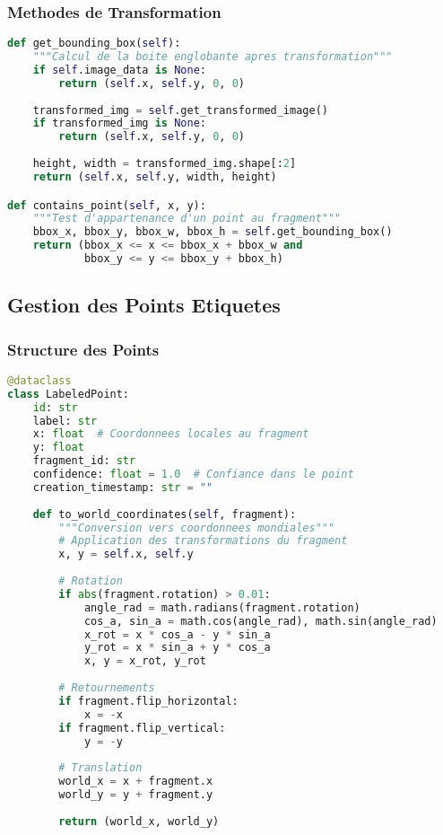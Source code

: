 \documentclass[12pt,a4paper]{article}
\begin{document}
\subsubsection{Methodes de Transformation}

\begin{lstlisting}[language=Python]
def get_bounding_box(self):
    """Calcul de la boite englobante apres transformation"""
    if self.image_data is None:
        return (self.x, self.y, 0, 0)
    
    transformed_img = self.get_transformed_image()
    if transformed_img is None:
        return (self.x, self.y, 0, 0)
    
    height, width = transformed_img.shape[:2]
    return (self.x, self.y, width, height)

def contains_point(self, x, y):
    """Test d'appartenance d'un point au fragment"""
    bbox_x, bbox_y, bbox_w, bbox_h = self.get_bounding_box()
    return (bbox_x <= x <= bbox_x + bbox_w and 
            bbox_y <= y <= bbox_y + bbox_h)
\end{lstlisting}

\subsection{Gestion des Points Etiquetes}

\subsubsection{Structure des Points}

\begin{lstlisting}[language=Python]
@dataclass
class LabeledPoint:
    id: str
    label: str
    x: float  # Coordonnees locales au fragment
    y: float
    fragment_id: str
    confidence: float = 1.0  # Confiance dans le point
    creation_timestamp: str = ""
    
    def to_world_coordinates(self, fragment):
        """Conversion vers coordonnees mondiales"""
        # Application des transformations du fragment
        x, y = self.x, self.y
        
        # Rotation
        if abs(fragment.rotation) > 0.01:
            angle_rad = math.radians(fragment.rotation)
            cos_a, sin_a = math.cos(angle_rad), math.sin(angle_rad)
            x_rot = x * cos_a - y * sin_a
            y_rot = x * sin_a + y * cos_a
            x, y = x_rot, y_rot
        
        # Retournements
        if fragment.flip_horizontal:
            x = -x
        if fragment.flip_vertical:
            y = -y
        
        # Translation
        world_x = x + fragment.x
        world_y = y + fragment.y
        
        return (world_x, world_y)
\end{lstlisting}
\end{document}
